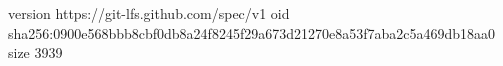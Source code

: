 version https://git-lfs.github.com/spec/v1
oid sha256:0900e568bbb8cbf0db8a24f8245f29a673d21270e8a53f7aba2c5a469db18aa0
size 3939

